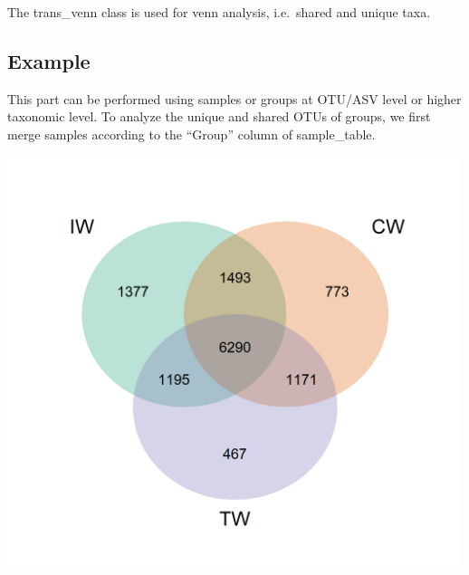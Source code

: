 \documentclass[
]{book}
\newenvironment{Shaded}{\begin{snugshade}}{\end{snugshade}}
\newcommand{\AttributeTok}[1]{\textcolor[rgb]{0.77,0.63,0.00}{#1}}
\newcommand{\CommentTok}[1]{\textcolor[rgb]{0.56,0.35,0.01}{\textit{#1}}}
\newcommand{\ConstantTok}[1]{\textcolor[rgb]{0.00,0.00,0.00}{#1}}
\newcommand{\FunctionTok}[1]{\textcolor[rgb]{0.00,0.00,0.00}{#1}}
\newcommand{\NormalTok}[1]{#1}
\newcommand{\OtherTok}[1]{\textcolor[rgb]{0.56,0.35,0.01}{#1}}
\newcommand{\SpecialCharTok}[1]{\textcolor[rgb]{0.00,0.00,0.00}{#1}}
\newcommand{\StringTok}[1]{\textcolor[rgb]{0.31,0.60,0.02}{#1}}
\begin{document}
The trans\_venn class is used for venn analysis, i.e.~shared and unique taxa.

\hypertarget{example-1}{%
\subsection{Example}\label{example-1}}

This part can be performed using samples or groups at OTU/ASV level or higher taxonomic level.
To analyze the unique and shared OTUs of groups,
we first merge samples according to the ``Group'' column of sample\_table.

\begin{Shaded}
\end{Shaded}

\begin{center}\includegraphics[width=500px]{Images/trans_venn_0} \end{center}
\end{document}
